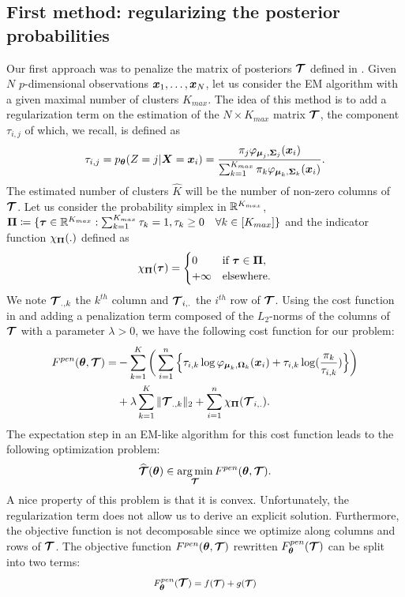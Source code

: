 \subsection{First method: regularizing the posterior probabilities}\label{sec:tau_pen_estim}
Our first approach was to penalize the matrix of posteriors $\boldsymbol{\mathcal T}$ defined in . Given $N$ $p$-dimensional observations $\boldsymbol x_1,\dots,\boldsymbol x_N$, let us consider the EM algorithm with a given maximal number of clusters $K_{max}$. The idea of this method is to add a regularization term on the estimation of the $N\times K_{max}$ matrix $\boldsymbol{\mathcal T}$, the component $\tau_{i,j}$ of which, we recall, is defined as 
\begin{equation}
  \tau_{i,j} = p_{{\boldsymbol\theta}}(Z=j | \boldsymbol X=\boldsymbol x_i) = \frac{\pi_j\varphi_{\boldsymbol\mu_j,\boldsymbol\Sigma_j}(\boldsymbol x_i)}{\sum_{k=1}^{K_{max}}\pi_k\varphi_{\boldsymbol\mu_k,\boldsymbol\Sigma_k}(\boldsymbol x_i)}.
\end{equation}
The estimated number of clusters $\hat K$ will be the number of non-zero columns of $\boldsymbol{\mathcal T}$. Let us consider the probability simplex in ${\mathbb R}^{K_{max}}$, $\boldsymbol\Pi\coloneqq \{\boldsymbol\tau \in {\mathbb R}^{K_{max}} : \sum_{k=1}^{K_{max}}\tau_k=1, \tau_k\geq 0 \quad \forall k \in [K_{max}] \}$ and the indicator function $\chi_{\boldsymbol\Pi}(.)$ defined as
\begin{equation*}
    \chi_{\boldsymbol\Pi}(\boldsymbol\tau) =
    \begin{cases}
      0 & \text{if } \boldsymbol\tau \in \boldsymbol\Pi,\\
        +\infty & \text{elsewhere}.
    \end{cases}
\end{equation*}
We note $\boldsymbol{\mathcal T}_{.,k}$ the $k^{th}$ column and $\boldsymbol{\mathcal T}_{i,.}$ the $i^{th}$ row of $\boldsymbol{\mathcal T}$. Using the cost function in  and adding a penalization term composed of the $L_2$-norms of the columns of $\boldsymbol{\mathcal T}$ with a parameter $\lambda > 0$, we have the following cost function for our problem:
\begin{align*}
F^{pen}({\boldsymbol\theta},\boldsymbol{\mathcal T})  =& -\sum_{k=1}^K \bigg(\sum_{i=1}^{n} \Big\{\tau_{i,k}\log\varphi_{\boldsymbol\mu_{k},\boldsymbol\Omega_{k}}(\boldsymbol x_i)+\tau_{i,k}\log(\frac{\pi_k}{\tau_{i,k}})\Big\}\bigg)\\
&+ \lambda\sum_{k=1}^K \|\boldsymbol{\mathcal T}_{.,k}\|_{2} + \sum_{i=1}^{n} \chi_{\boldsymbol\Pi}(\boldsymbol{\mathcal T}_{i,.}).
\end{align*}
The expectation step in an EM-like algorithm for this cost function leads to the following optimization problem:
\begin{equation}
\widehat{\boldsymbol{\mathcal T}}({\boldsymbol\theta})\in \operatorname*{arg\,min}_{\boldsymbol{\mathcal T}} F^{pen}({\boldsymbol\theta},\boldsymbol{\mathcal T}).
\end{equation}
A nice property of this problem is that it is convex. Unfortunately, the regularization term does not allow us to derive an explicit solution. Furthermore, the objective function is not decomposable since we optimize along columns and rows of $\boldsymbol{\mathcal T}$. The objective function $F^{pen}({\boldsymbol\theta},\boldsymbol{\mathcal T})$ rewritten $F^{pen}_{{\boldsymbol\theta}}(\boldsymbol{\mathcal T})$ can be split into two terms:
\begin{equation}
F^{pen}_{{\boldsymbol\theta}}(\boldsymbol{\mathcal T})={\large f}({\footnotesize\boldsymbol{\mathcal T}})+ {\large g}({\footnotesize\boldsymbol{\mathcal T}})
\end{equation}

